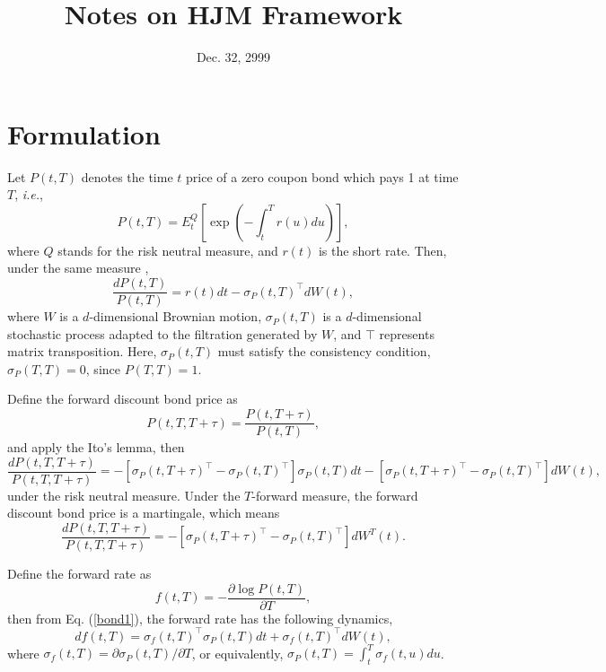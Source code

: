 \documentclass[12pt]{article}
\begin{document}
\title{Notes on HJM Framework}
\date{Dec. 32, 2999}

\maketitle

\section{Formulation}

  Let $P(t,T)$ denotes the time $t$ price of a zero coupon bond which pays 1 at time $T$, {\it i.e.},
  \begin{equation}
    P(t,T)=E_t^Q\left[\exp\left(-\int_t^T r(u)du\right)\right],
  \end{equation}
  where $Q$ stands for the risk neutral measure, and $r(t)$ is the short rate. Then, under the same measure \cite{AP},
  \begin{equation}
    \label{bond1}
    \frac{dP(t,T)}{P(t,T)}=r(t)dt-\sigma_P(t,T)^{{\top}}dW(t),
  \end{equation}
  where $W$ is a $d$-dimensional Brownian motion, $\sigma_P(t,T)$ is a
  $d$-dimensional stochastic process adapted to the filtration generated by $W$,
  and $\top$ represents matrix transposition. Here, $\sigma_P(t,T)$ must
  satisfy the consistency condition, $\sigma_P(T,T)=0$, since $P(T,T)=1$.

  Define the forward discount bond price as
  \begin{equation}
    P(t,T,T+\tau)=\frac{P(t,T+\tau)}{P(t,T)},
  \end{equation}
  and apply the Ito's lemma, then
  \begin{equation}
    \label{bond2}
    \frac{dP(t,T,T+\tau)}{P(t,T,T+\tau)}=-\left[\sigma_P(t,T+\tau)^{\top}-\sigma_P(t,T)^{\top}\right]\sigma_P(t,T)dt
                                        -\left[\sigma_P(t,T+\tau)^{\top}-\sigma_P(t,T)^{\top}\right]dW(t),
  \end{equation}
  under the risk neutral measure. Under the $T$-forward measure, the forward discount bond price is a martingale,
  which means
  \begin{equation}
    \label{bond3}
    \frac{dP(t,T,T+\tau)}{P(t,T,T+\tau)}=-\left[\sigma_P(t,T+\tau)^{\top}-\sigma_P(t,T)^{\top}\right]dW^T(t).
  \end{equation}

  Define the forward rate as
  \begin{equation}
    f(t,T)=-\frac{\partial\log P(t,T)}{\partial T},
  \end{equation}
  then from Eq. (\ref{bond1}), the forward rate has the following dynamics,
  \begin{equation}
    \label{rate}
    df(t,T)=\sigma_f(t,T)^{\top}\sigma_P(t,T)dt+\sigma_f(t,T)^{\top}dW(t),
  \end{equation}
  where $\sigma_f(t,T)=\partial\sigma_P(t,T)/\partial T$, or equivalently,
  $\sigma_P(t,T)=\int_t^T\sigma_f(t,u)du$.
\end{document}
